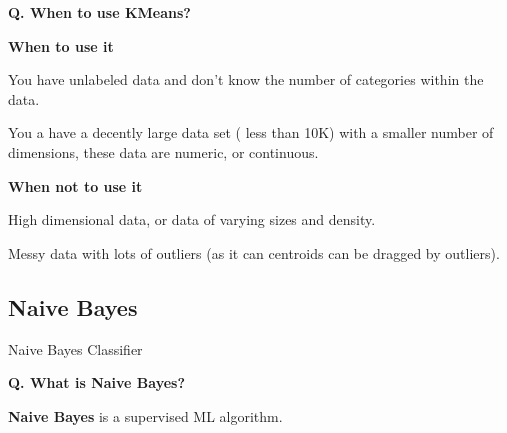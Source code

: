 \begin{frame}[fragile]{\textbf{Q. When to use KMeans?}}
  \vspace{.4em}
  \begin{wideitemize}
    \item \textbf{When to use it}
    \begin{wideitemize}
      \item You have unlabeled data and don't know the number of categories
      within the data.
      \item You a have a decently large data set ( less than 10K) with
      a smaller number of dimensions, these data are numeric, or continuous.
    \end{wideitemize}
    \item \textbf{When not to use it}
    \begin{wideitemize}
      \item High dimensional data, or data of varying sizes and density.
      \item Messy data with lots of outliers (as it can centroids can be dragged by outliers).
    \end{wideitemize}
  \end{wideitemize}
\end{frame}


\subsection{Naive Bayes}
\begin{transitionsubframe}
  \begin{center}
    \Huge Naive Bayes Classifier
  \end{center}
\end{transitionsubframe}


\begin{frame}[fragile]{\textbf{Q. What is Naive Bayes?}}
  \begin{wideitemize}
  \item \textbf{Naive Bayes} is a supervised ML algorithm.
  \end{wideitemize}
\end{frame}



